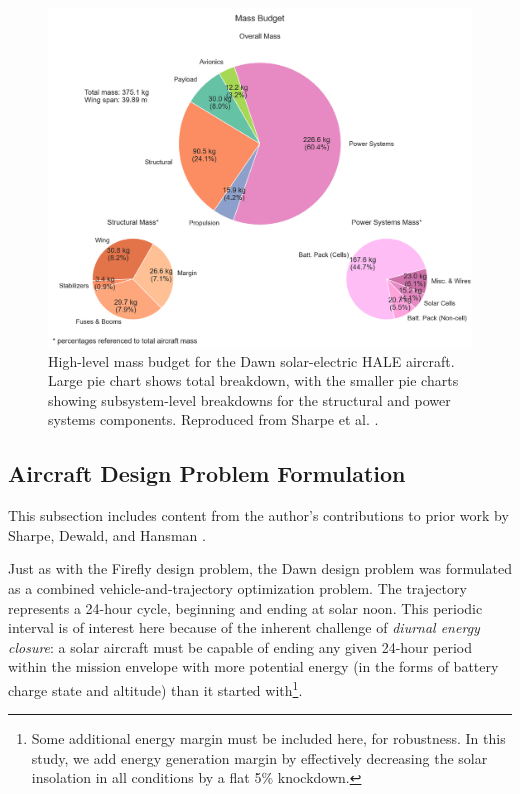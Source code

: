 \begin{figure}[!htbp]
    \centering
    \includegraphics[width=\textwidth, trim=1mm 1mm 0.4mm 1mm, clip=true]{../figures/dawnfigures/Mass_breakdown_baseline.png}
    \caption{High-level mass budget for the Dawn solar-electric HALE aircraft. Large pie chart shows total breakdown, with the smaller pie charts showing subsystem-level breakdowns for the structural and power systems components. Reproduced from Sharpe et al. \cite{sharpe_optimization_2021}.}
    \label{fig:dawn_mass_budget}
\end{figure}

\subsection{Aircraft Design Problem Formulation}
\label{sec:dawn-mdo}

\begin{attrib}
    This subsection includes content from the author's contributions to prior work by Sharpe, Dewald, and Hansman \cite{sharpe_optimization_2021}.
\end{attrib}

Just as with the Firefly design problem, the Dawn design problem was formulated as a combined vehicle-and-trajectory optimization problem. The trajectory represents a 24-hour cycle, beginning and ending at solar noon. This periodic interval is of interest here because of the inherent challenge of \emph{diurnal energy closure}: a solar aircraft must be capable of ending any given 24-hour period within the mission envelope with more potential energy (in the forms of battery charge state and altitude) than it started with\footnote{Some additional energy margin must be included here, for robustness. In this study, we add energy generation margin by effectively decreasing the solar insolation in all conditions by a flat 5\% knockdown.}.

